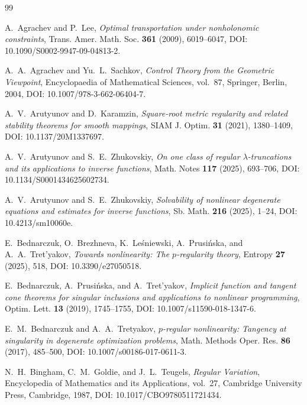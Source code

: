 \documentclass[11pt]{amsart}
\theoremstyle{definition}
\theoremstyle{remark}
\begin{document}
	
	\begin{thebibliography}{99}
		
		A.~Agrachev and P.~Lee,
		\emph{Optimal transportation under nonholonomic constraints},
		Trans. Amer. Math. Soc. \textbf{361} (2009), 6019--6047,
		DOI: 10.1090/S0002-9947-09-04813-2.
		
		A.~A.~Agrachev and Yu.~L.~Sachkov,
		\emph{Control Theory from the Geometric Viewpoint},
		Encyclopaedia of Mathematical Sciences, vol.~87,
		Springer, Berlin, 2004,
		DOI: 10.1007/978-3-662-06404-7.
		
		A.~V.~Arutyunov and D.~Karamzin,
		\emph{Square-root metric regularity and related stability theorems for
			smooth mappings},
		SIAM J. Optim. \textbf{31} (2021), 1380--1409,
		DOI: 10.1137/20M1337697.
		
		A.~V.~Arutyunov and S.~E.~Zhukovskiy,
		\emph{On one class of regular $\lambda$-truncations and its applications
			to inverse functions},
		Math. Notes \textbf{117} (2025), 693--706,
		DOI: 10.1134/S0001434625602734.
		
		A.~V.~Arutyunov and S.~E.~Zhukovskiy,
		\emph{Solvability of nonlinear degenerate equations and estimates for
			inverse functions},
		Sb. Math. \textbf{216} (2025), 1--24,
		DOI: 10.4213/sm10060e.
		
		E.~Bednarczuk, O.~Brezhneva, K.~Le\'sniewski, A.~Prusi\'nska, and
		A.~A.~Tret'yakov,
		\emph{Towards nonlinearity: The $p$-regularity theory},
		Entropy \textbf{27} (2025), 518,
		DOI: 10.3390/e27050518.
		
		E.~Bednarczuk, A.~Prusi\'nska, and A.~Tret'yakov,
		\emph{Implicit function and tangent cone theorems for singular inclusions
			and applications to nonlinear programming},
		Optim. Lett. \textbf{13} (2019), 1745--1755,
		DOI: 10.1007/s11590-018-1347-6.
		
		E.~M.~Bednarczuk and A.~A.~Tretyakov,
		\emph{$p$-regular nonlinearity: Tangency at singularity in degenerate
			optimization problems},
		Math. Methods Oper. Res. \textbf{86} (2017), 485--500,
		DOI: 10.1007/s00186-017-0611-3.
		
		N.~H.~Bingham, C.~M.~Goldie, and J.~L.~Teugels,
		\emph{Regular Variation},
		Encyclopedia of Mathematics and its Applications, vol.~27,
		Cambridge University Press, Cambridge, 1987,
		DOI: 10.1017/CBO9780511721434.
		

\end{thebibliography}
\end{document}
